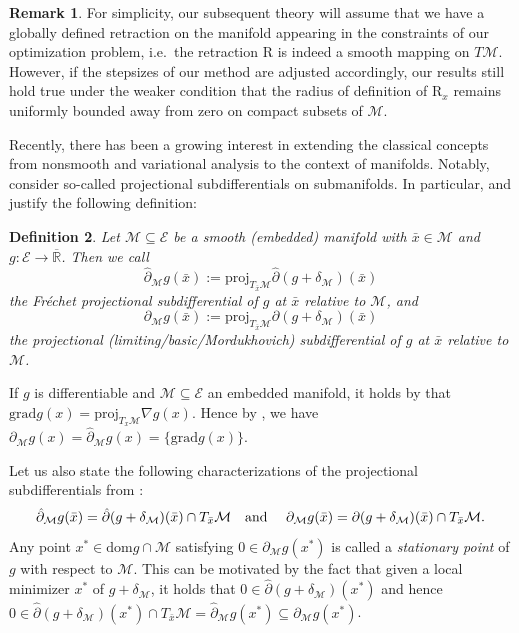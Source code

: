 \documentclass[a4paper, 12pt]{article}
\numberwithin{equation}{section}
\theoremstyle{bolddef}
\newtheorem{definition}{Definition}[section]
\theoremstyle{definition}
\newtheorem{remark}[definition]{Remark}
\theoremstyle{boldplain}
\newcommand{\barR}{\overline{\mathbb{R}}}
\newcommand{\X}{\mathcal{E}}
\newcommand{\dom}{\mathrm{dom}}
\newcommand{\proj}{\mathrm{proj}}
\newcommand{\grad}{\mathrm{grad}}
\newcommand{\retr}{\mathrm{R}}
\begin{document}
\begin{remark}\label{remark:boundedefradr}
For simplicity, our subsequent theory will assume that we have a globally defined retraction on the manifold appearing in the constraints of our optimization problem, i.e.\ the retraction $\retr$ is indeed a smooth mapping on $T \mathcal{M}$. However, if the stepsizes of our method are adjusted accordingly, our results still hold true under the weaker condition that the radius of definition of $\retr_x$ remains uniformly bounded away from zero on compact subsets of $\mathcal{M}$.
\end{remark}

Recently, there has been a growing interest in extending the classical concepts from nonsmooth and variational analysis to the context of manifolds. Notably, \cite{Khanh2026} consider so-called projectional subdifferentials on submanifolds. In particular, \cite[Definition 3.1]{Khanh2026} and \cite[Theorem 3.1]{Khanh2026} justify the following definition:
\begin{definition}
	Let $\mathcal{M} \subseteq \X$ be a smooth (embedded) manifold with $\bar x \in \mathcal{M}$ and $g : \X \to \barR$. Then we call
	\begin{equation*}
		\hat \partial_\mathcal{M} g(\bar x) := \proj_{T_{\bar x} \mathcal{M}} \hat \partial (g + \delta_\mathcal{M}) (\bar x)
	\end{equation*}
	the \emph{Fréchet projectional subdifferential} of $g$ at $\bar x$ relative to $\mathcal{M}$, and 
	\begin{equation*}
		\partial_\mathcal{M} g(\bar x) := \proj_{T_{\bar x}\mathcal{M}} \partial (g + \delta_\mathcal{M})(\bar x)
	\end{equation*}
	the \emph{projectional (limiting/basic/Mordukhovich) subdifferential} of $g$ at $\bar x$ relative to $\mathcal{M}$.
\end{definition}
If $g$ is differentiable and $\mathcal{M} \subseteq \mathcal{E}$ an embedded manifold, it holds by \cite[Equation 3.37]{Absil2008} that $\grad g(x) = \proj_{T_x\mathcal{M}} \nabla g(x)$. Hence by \cite[Proposition 3.2]{Khanh2026}, we have $\partial_\mathcal{M} g(x) = \hat \partial_\mathcal{M} g(x) = \{\grad g(x)\}$.

Let us also state the following characterizations of the projectional subdifferentials from \cite{Khanh2026}:
\begin{equation}
	\hat \partial_\mathcal{M} g(\bar x) = \hat \partial (g  + \delta_\mathcal{M})(\bar x) \cap T_{\bar x}\mathcal{M} \text{\quad and \quad} \partial_\mathcal{M} g(\bar x) = \partial (g  + \delta_\mathcal{M})(\bar x) \cap T_{\bar x}\mathcal{M}.\label{eq:projsubdiffchar}
\end{equation}
Any point $x^* \in \dom g \cap \mathcal{M}$ satisfying $0 \in \partial_\mathcal{M} g (x^*)$ is called a \emph{stationary point} of $g$ with respect to $\mathcal{M}$. This can be motivated by the fact that given a local minimizer $x^*$ of $g + \delta_\mathcal{M}$, it holds that $0 \in \hat \partial(g + \delta_\mathcal{M})(x^*)$ and hence $0 \in \hat \partial (g+\delta_\mathcal{M})(x^*) \cap T_{\bar x}\mathcal{M} = \hat \partial_\mathcal{M} g(x^*) \subseteq \partial_\mathcal{M} g(x^*)$.
\end{document}
